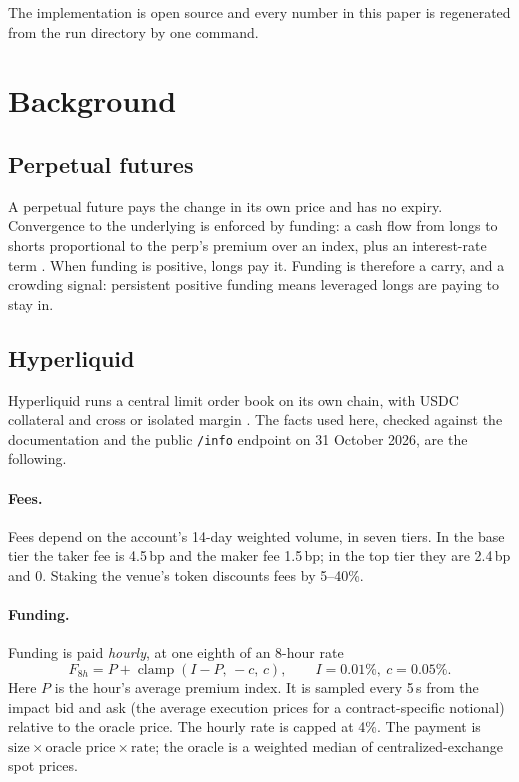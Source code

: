 \documentclass[11pt]{article}
\theoremstyle{remark}
\newcommand{\clamp}{\operatorname{clamp}}
\begin{document}
The implementation is open source and every number in this paper is regenerated from the run directory by one command.

\section{Background}\label{sec:background}

\subsection{Perpetual futures}
A perpetual future pays the change in its own price and has no expiry. Convergence to the underlying is enforced by funding: a cash flow from longs to shorts proportional to the perp's premium over an index, plus an interest-rate term \citep{he2022fundamentals,ackerer2024perpetual}. When funding is positive, longs pay it. Funding is therefore a carry, and a crowding signal: persistent positive funding means leveraged longs are paying to stay in.

\subsection{Hyperliquid}
Hyperliquid runs a central limit order book on its own chain, with USDC collateral and cross or isolated margin \citep{hyperliquiddocs}. The facts used here, checked against the documentation and the public \texttt{/info} endpoint on 31 October 2026, are the following.

\paragraph{Fees.} Fees depend on the account's 14-day weighted volume, in seven tiers. In the base tier the taker fee is 4.5\,bp and the maker fee 1.5\,bp; in the top tier they are 2.4\,bp and 0. Staking the venue's token discounts fees by 5--40\%.

\paragraph{Funding.} Funding is paid \emph{hourly}, at one eighth of an 8-hour rate
\begin{equation}\label{eq:funding}
F_{8h} = P + \clamp\!\left(I - P,\,-c,\,c\right),\qquad I = 0.01\%,\ c = 0.05\%.
\end{equation}
Here $P$ is the hour's average premium index. It is sampled every 5\,s from the impact bid and ask (the average execution prices for a contract-specific notional) relative to the oracle price. The hourly rate is capped at 4\%. The payment is $\text{size}\times\text{oracle price}\times\text{rate}$; the oracle is a weighted median of centralized-exchange spot prices.
\end{document}
